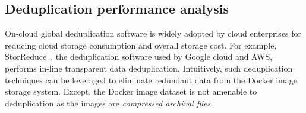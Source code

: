 \subsection{Deduplication performance analysis} %
\label{sec:background}


On-cloud global deduplication software is widely adopted by cloud enterprises for reducing cloud storage consumption and overall storage cost. 
For example, StorReduce~\cite{storReduce}, the deduplication software used by
Google cloud and AWS, 
performs in-line transparent data deduplication. 
Intuitively, such deduplication techniques can be leveraged to eliminate redundant data from the Docker image storage system.  
Except, the Docker image dataset is not amenable to deduplication 
as the images are \emph{compressed archival files}.


